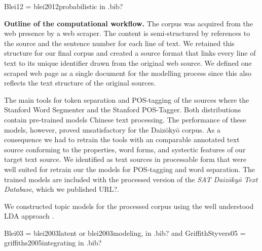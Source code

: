 \documentclass[a4paper,10pt]{article}
\newcommand{\TODO}[1]{\begingroup\color{red}#1\endgroup}
\begin{document}
\TODO{Blei12 = blei2012probabilistic in .bib?}

\textbf{Outline of the computational workflow.} The corpus was acquired
from the web presence by a web scraper. The content is semi-structured by
references to the source and the sentence number for each line of text. We
retained this structure for our final corpus and created a source format
that links every line of text to its unique identifier drawn from the
original web source. We defined one scraped web page as a single document
for the modelling process since this also reflects the text structure of
the original sources.
    
  The main tools for token separation and POS-tagging of the sources where
  the Stanford Word Segmenter and the Stanford POS-Tagger. Both
  distributions contain pre-trained models Chinese text processing. The
  performance of these models, however, proved unsatisfactory for the
  Daiz{\=o}ky{\=o} corpus. As a consequence we had to retrain the tools
  with an comparable annotated text source conforming to the properties,
  word forms, and \TODO{systectic} features of our target text source.  We
  identified \cite{Lee:12,Wong:16} as text sources in processable form that
  were well suited for retrain our the models for POS-tagging and 
  word separation. The trained models are included with the
  processed version of the \textit{SAT Daiz{\=o}ky{\=o} Text Database},
  which we published \TODO{URL?}.  

  We constructed topic models for the processed corpus using the well
  understood LDA approach \cite{Blei03,GriffithStyvers05}.
  
  \TODO{Blei03 = blei2003latent or blei2003modeling, in .bib? and GriffithStyvers05
  = griffiths2005integrating in .bib?}

\end{document}
